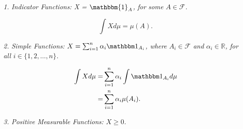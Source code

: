\documentclass[10pt, oneside]{article}
\newcommand{\R}{\mathbb{R}}
\begin{document}
\emph{1. Indicator Functions:  X = $\mathbbm{1}_A$, for some $A \in \mathcal{F}$. }

\[\int{X d\mu} = \mu(A). \]

\emph{2. Simple Functions: $X = \sum_{i=1}^{n}\alpha_{i}\ind_{A_{i}}$, where $A_{i} \in \mathcal{F}$
and $\alpha_{i} \in \R$, for all $i \in \{1,2,\dots,n\}$.} 

\begin{align*}
    \int{X d\mu} = & \sum_{i=1}^{n}\alpha_{i} \int{\ind_{A_{i}} d\mu} \\
                 = & \sum_{i=1}^{n}\alpha_{i} \mu(A_{i}). 
\end{align*}

\emph{3. Positive Measurable Functions: $X \geq 0$. }

\end{document}
